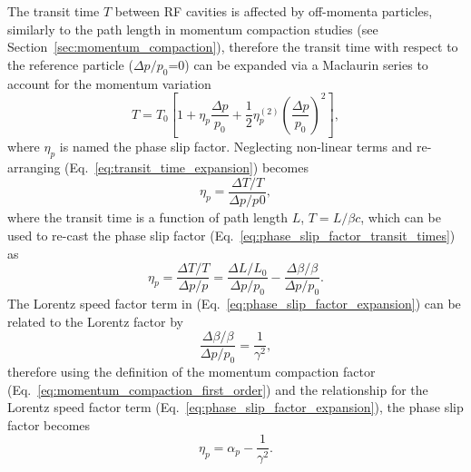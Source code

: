 \documentclass[../main.tex]{subfiles}
\begin{document}
The transit time $T$ between RF cavities is affected by off-momenta particles, similarly to the path length in momentum compaction studies (see Section~\ref{sec:momentum_compaction}), therefore the transit time with respect to the reference particle ($\Delta p/p_{0}$=0) can be expanded via a Maclaurin series to account for the momentum variation
\begin{equation}
T = T_{0}\left[1+\eta_{p}\frac{\Delta p}{p_{0}}+\frac{1}{2}\eta_{p}^{\left(2\right)}\left(\frac{\Delta p}{p_{0}}\right)^{2}\right],
\label{eq:transit_time_expansion}    
\end{equation}
where $\eta_{p}$ is named the phase slip factor. Neglecting non-linear terms and re-arranging (Eq.~\ref{eq:transit_time_expansion}) becomes
\begin{equation}
\eta_{p} = \frac{\Delta T/T}{\Delta p/p_{}0},
\label{eq:phase_slip_factor_transit_time}    
\end{equation}
where the transit time is a function of path length $L$, $T = L/\beta c$, which can be used to re-cast the phase slip factor (Eq.~\ref{eq:phase_slip_factor_transit_times}) as  
\begin{equation}
\eta_{p} = \frac{\Delta T/T}{\Delta p/p} = \frac{\Delta L/L_{0}}{\Delta p/p_{0}}-\frac{\Delta\beta/\beta}{\Delta p/p_{0}}.
\label{eq:phase_slip_factor_expansion}    
\end{equation}
The Lorentz speed factor term in (Eq.~\ref{eq:phase_slip_factor_expansion}) can be related to the Lorentz factor \cite{wolski2012longitudinal} by 
\begin{equation}
\frac{\Delta\beta/\beta}{\Delta p/p_{0}} = \frac{1}{\gamma^{2}},
\label{eq:phase_slip_Lorentz_relation}    
\end{equation}
therefore using the definition of the momentum compaction factor (Eq.~\ref{eq:momentum_compaction_first_order}) and the relationship for the Lorentz speed factor term (Eq.~\ref{eq:phase_slip_factor_expansion}), the phase slip factor becomes
\begin{equation}
\eta_{p} = \alpha_{p} - \frac{1}{\gamma^{2}}.
\label{eq:phase_slip_factor}    
\end{equation}
\end{document}
